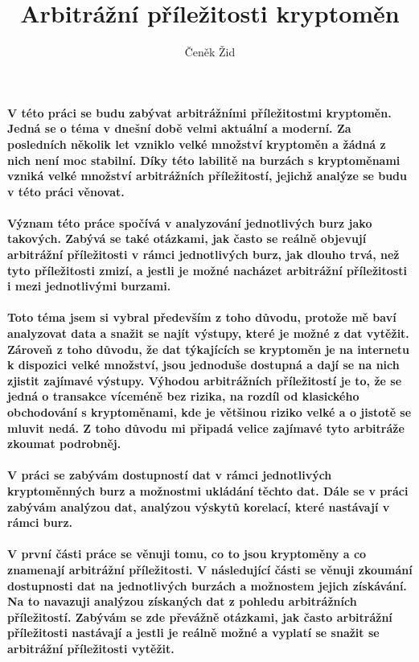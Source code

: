 \documentclass[thesis=B,czech]{FITthesis}[2019/03/21]
\title{Arbitrážní příležitosti kryptoměn}
\author{Čeněk Žid} %
\begin{document}

\begin{introduction}
\paragraph{
V této práci se budu zabývat arbitrážními příležitostmi kryptoměn. Jedná se o téma v dnešní době velmi aktuální a moderní. Za posledních několik let vzniklo velké množství kryptoměn a žádná z nich není moc stabilní. Díky této labilitě na burzách s kryptoměnami vzniká velké množství arbitrážních příležitostí, jejichž analýze se budu v této práci věnovat.
}
\paragraph{
Význam této práce spočívá v analyzování jednotlivých burz jako takových. Zabývá se také otázkami, jak často se reálně objevují arbitrážní příležitosti v rámci jednotlivých burz, jak dlouho trvá, než tyto příležitosti zmizí, a jestli je možné nacházet arbitrážní příležitosti i mezi jednotlivými burzami.
}
\paragraph{
Toto téma jsem si vybral především z toho důvodu, protože mě baví analyzovat data a snažit se najít výstupy, které je možné z dat vytěžit. Zároveň z toho důvodu, že dat týkajících se kryptoměn je na internetu k dispozici velké množství, jsou jednoduše dostupná a dají se na nich zjistit zajímavé výstupy. Výhodou arbitrážních příležitostí je to, že se jedná o transakce víceméně bez rizika, na rozdíl od klasického obchodování s kryptoměnami, kde je většinou riziko velké a o jistotě se mluvit nedá. Z toho důvodu mi připadá velice zajímavé tyto arbitráže zkoumat podrobněj. 
}
\paragraph{
V práci se zabývám dostupností dat v rámci jednotlivých kryptoměnných burz a možnostmi ukládání těchto dat. Dále se v práci zabývám analýzou dat, analýzou výskytů korelací, které nastávají v rámci burz.
}
\paragraph{
V první části práce se věnuji tomu, co to jsou kryptoměny a co znamenají arbitrážní příležitosti. V následující části se věnuji zkoumání dostupnosti dat na jednotlivých burzách a možnostem jejich získávání. Na to navazuji analýzou získaných dat z pohledu arbitrážních příležitostí. Zabývám se zde převážně otázkami, jak často arbitrážní příležitosti nastávají a jestli je reálně možné a vyplatí se snažit se arbitrážní příležitosti vytěžit.
}

\end{introduction}
\end{document}
